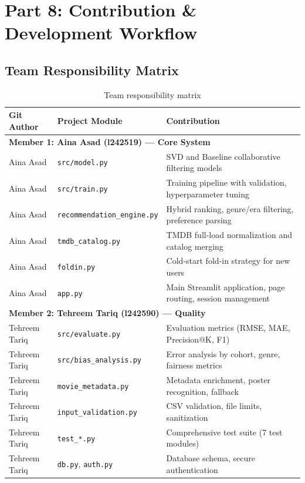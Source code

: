 \documentclass[11pt,a4paper]{article}
\renewcommand{\arraystretch}{1.25}
\begin{document}

\section{Part 8: Contribution \& Development Workflow}

\subsection{Team Responsibility Matrix}

\begin{table}[H]
\centering
\small
\renewcommand{\arraystretch}{1.25}
\begin{tabularx}{\textwidth}{p{3.0cm}p{4.2cm}>{\raggedright\arraybackslash}X}
\toprule
\textbf{Git Author} & \textbf{Project Module} & \textbf{Contribution} \\
\midrule
\multicolumn{3}{l}{\textbf{Member 1: Aina Asad (l242519) — Core System}} \\
\midrule
Aina Asad & \texttt{src/model.py} & SVD and Baseline collaborative filtering models \\
\addlinespace
Aina Asad & \texttt{src/train.py} & Training pipeline with validation, hyperparameter tuning \\
\addlinespace
Aina Asad & \texttt{recommendation\_engine.py} & Hybrid ranking, genre/era filtering, preference parsing \\
\addlinespace
Aina Asad & \texttt{tmdb\_catalog.py} & TMDB full-load normalization and catalog merging \\
\addlinespace
Aina Asad & \texttt{foldin.py} & Cold-start fold-in strategy for new users \\
\addlinespace
Aina Asad & \texttt{app.py} & Main Streamlit application, page routing, session management \\
\midrule
\multicolumn{3}{l}{\textbf{Member 2: Tehreem Tariq (l242590) — Quality}} \\
\midrule
Tehreem Tariq & \texttt{src/evaluate.py} & Evaluation metrics (RMSE, MAE, Precision@K, F1) \\
\addlinespace
Tehreem Tariq & \texttt{src/bias\_analysis.py} & Error analysis by cohort, genre, fairness metrics \\
\addlinespace
Tehreem Tariq & \texttt{movie\_metadata.py} & Metadata enrichment, poster recognition, fallback \\
\addlinespace
Tehreem Tariq & \texttt{input\_validation.py} & CSV validation, file limits, sanitization \\
\addlinespace
Tehreem Tariq & \texttt{test\_*.py} & Comprehensive test suite (7 test modules) \\
\addlinespace
Tehreem Tariq & \texttt{db.py}, \texttt{auth.py} & Database schema, secure authentication \\
\bottomrule
\end{tabularx}
\caption{Team responsibility matrix}
\label{tab:contributions}
\end{table}
\end{document}
